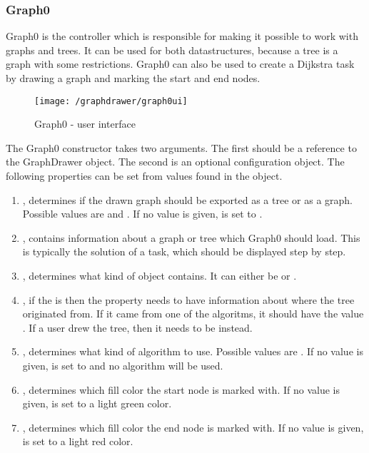 \subsubsection{Graph0}
Graph0 is the controller which is responsible for making it possible to work with graphs and trees. It can be used for both datastructures, because a tree is a graph with some restrictions. Graph0 can also be used to create a Dijkstra task by drawing a graph and marking the start and end nodes. 
\begin{figure}[h]
    \centering
    \texttt{[image: /graphdrawer/graph0ui]}
    \caption{Graph0 - user interface}
    \label{fig:graphdrawerGraph0UserInterface}
\end{figure}
The Graph0 constructor takes two arguments. The first should be a reference to the GraphDrawer object. The second is an optional configuration object. The following properties can be set from values found in the object.
\begin{enumerate}
    \item {}, determines if the drawn graph should be exported as a tree or as a graph. Possible values are  and . If no value is given,  is set to .
    \item {}, contains information about a graph or tree which Graph0 should load. This is typically the solution of a task, which should be displayed step by step.
    \item {}, determines what kind of object  contains. It can either be  or .
    \item {}, if the  is  then the  property needs to have information about where the tree originated from. If it came from one of the algoritms, it should have the value . If a user drew the tree, then it needs to be  instead.
    \item {}, determines what kind of algorithm to use. Possible values are . If no value is given,  is set to  and no algorithm will be used.
    \item {}, determines which fill color the start node is marked with. If no value is given,  is set to a light green color.
    \item {}, determines which fill color the end node is marked with. If no value is given,  is set to a light red color.
\end{enumerate}
